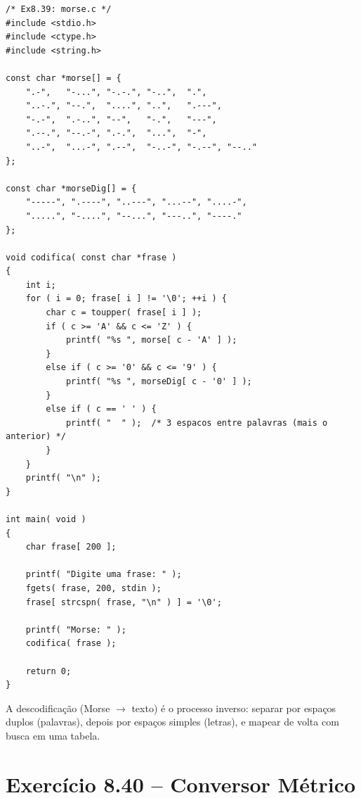 \documentclass[12pt,a4paper]{article}
\begin{document}
\begin{respostabox}
\begin{lstlisting}
/* Ex8.39: morse.c */
#include <stdio.h>
#include <ctype.h>
#include <string.h>

const char *morse[] = {
    ".-",   "-...", "-.-.", "-..",  ".",
    "..-.", "--.",  "....", "..",   ".---",
    "-.-",  ".-..", "--",   "-.",   "---",
    ".--.", "--.-", ".-.",  "...",  "-",
    "..-",  "...-", ".--",  "-..-", "-.--", "--.."
};

const char *morseDig[] = {
    "-----", ".----", "..---", "...--", "....-",
    ".....", "-....", "--...", "---..", "----."
};

void codifica( const char *frase )
{
    int i;
    for ( i = 0; frase[ i ] != '\0'; ++i ) {
        char c = toupper( frase[ i ] );
        if ( c >= 'A' && c <= 'Z' ) {
            printf( "%s ", morse[ c - 'A' ] );
        }
        else if ( c >= '0' && c <= '9' ) {
            printf( "%s ", morseDig[ c - '0' ] );
        }
        else if ( c == ' ' ) {
            printf( "  " );  /* 3 espacos entre palavras (mais o anterior) */
        }
    }
    printf( "\n" );
}

int main( void )
{
    char frase[ 200 ];

    printf( "Digite uma frase: " );
    fgets( frase, 200, stdin );
    frase[ strcspn( frase, "\n" ) ] = '\0';

    printf( "Morse: " );
    codifica( frase );

    return 0;
}
\end{lstlisting}

A descodificação (Morse $\to$ texto) é o processo inverso: separar por espaços
duplos (palavras), depois por espaços simples (letras), e mapear de volta com
busca em uma tabela.
\end{respostabox}

\newpage

\section{Exercício 8.40 -- Conversor Métrico}
\end{document}

